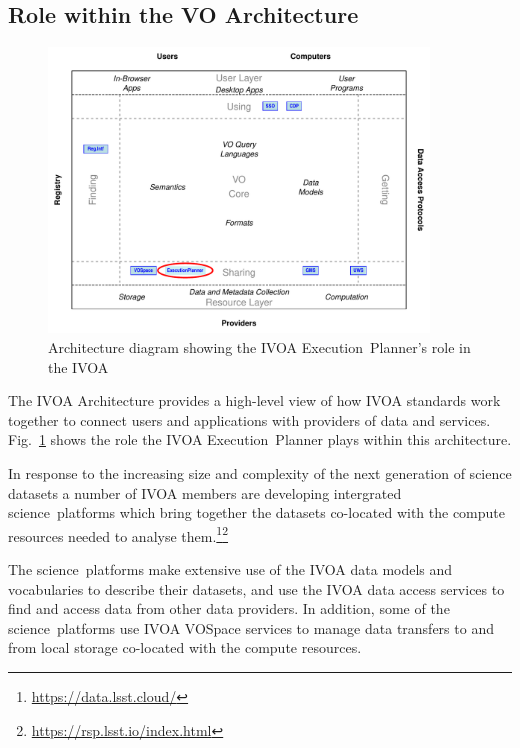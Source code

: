 \documentclass[11pt,a4paper]{ivoa}
\newcommand{\ivoa} {IVOA}
\newcommand{\vospace} {VOSpace}
\newcommand{\executionplanner} {Execution~Planner}
\newcommand{\footurl}[1] {\footnote{\url{#1}}}
\newcommand{\dataset} {dataset}
\newcommand{\scienceplatform} {science~platform}
\begin{document}
\subsection{Role within the VO Architecture}
\label{subsec:ivoarole}

\begin{figure}
\centering
\includegraphics[width=0.9\textwidth]{role_diagram.pdf}
\caption{Architecture diagram showing the \ivoa{} \executionplanner{}'s role in the \ivoa}
\label{fig:archdiag}
\end{figure}

The IVOA Architecture\citep{2010ivoa.rept.1123A} provides a high-level view of how IVOA
standards work together to connect users and applications with providers of data
and services.
Fig.~\ref{fig:archdiag} shows the role the \ivoa{} \executionplanner{} plays within this architecture.

In response to the increasing size and complexity of the next generation of science \dataset{}s
a number of \ivoa{} members are developing intergrated \scienceplatform{}s which bring
together the \dataset{}s co-located with the compute resources needed to analyse
them.\footurl{https://data.lsst.cloud/}\footurl{https://rsp.lsst.io/index.html}

The \scienceplatform{}s make extensive use of the \ivoa{} data models and
vocabularies to describe their \dataset{}s, and use the \ivoa{} data access
services to find and access data from other data providers.
In addition, some of the \scienceplatform{}s use \ivoa{} \vospace{} services to manage
data transfers to and from local storage co-located with the compute resources.
\end{document}
